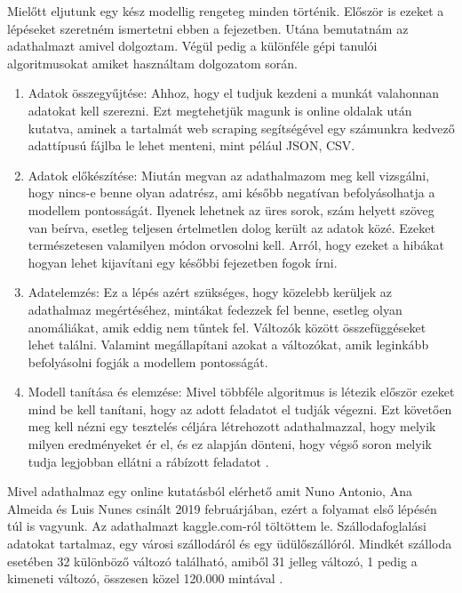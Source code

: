 
Mielőtt eljutunk egy kész modellig rengeteg minden történik. Először is ezeket a lépéseket szeretném ismertetni ebben a fejezetben. Utána bemutatnám az adathalmazt amivel dolgoztam. Végül pedig a különféle gépi tanulói algoritmusokat amiket használtam dolgozatom során.

\begin{enumerate}
    \item Adatok összegyűjtése: Ahhoz, hogy el tudjuk kezdeni a munkát valahonnan adatokat kell szerezni. Ezt megtehetjük magunk is online oldalak után kutatva, aminek a tartalmát web scraping segítségével egy számunkra kedvező adattípusú fájlba le lehet menteni, mint pélául JSON, CSV.
    \item Adatok előkészítése: Miután megvan az adathalmazom meg kell vizsgálni, hogy nincs-e benne olyan adatrész, ami később negatívan befolyásolhatja a modellem pontosságát. Ilyenek lehetnek az üres sorok, szám helyett szöveg van beírva, esetleg teljesen értelmetlen dolog került az adatok közé. Ezeket természetesen valamilyen módon orvosolni kell. Arról, hogy ezeket a hibákat hogyan lehet kijavítani egy későbbi fejezetben fogok írni.
    \item Adatelemzés: Ez a lépés azért szükséges, hogy közelebb kerüljek az adathalmaz megértéséhez, mintákat fedezzek fel benne, esetleg olyan anomáliákat, amik eddig nem tűntek fel. Változók között összefüggéseket lehet találni. Valamint megállapítani azokat a változókat, amik leginkább befolyásolni fogják a modellem pontosságát.
    \item Modell tanítása és elemzése: Mivel többféle algoritmus is létezik először ezeket mind be kell tanítani, hogy az adott feladatot el tudják végezni. Ezt követően meg kell nézni egy tesztelés céljára létrehozott adathalmazzal, hogy melyik milyen eredményeket ér el, és ez alapján dönteni, hogy végső soron melyik tudja legjobban ellátni a rábízott feladatot \cite{machinelearningbasics}. 
\end{enumerate}


Mivel adathalmaz egy online kutatásból elérhető amit Nuno Antonio, Ana Almeida és Luis Nunes csinált 2019 februárjában, ezért a folyamat első lépésén túl is vagyunk. Az adathalmazt kaggle.com-ról töltöttem le. Szállodafoglalási adatokat tartalmaz, egy városi szállodáról és egy üdülőszállóról. Mindkét szálloda esetében 32 különböző változó található, amiből 31 jelleg változó, 1 pedig a kimeneti változó, összesen közel 120.000 mintával \cite{adathalmaz}.

